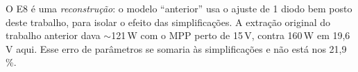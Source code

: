 \begin{atencao}[: ressalva]
O E8 \'e uma \emph{reconstru\c{c}\~ao}: o modelo ``anterior'' usa o ajuste de 1 diodo bem posto deste trabalho, para isolar o efeito das simplifica\c{c}\~oes. A extra\c{c}\~ao original do trabalho anterior dava $\sim$121\,W com o MPP perto de 15\,V, contra 160\,W
em 19,6\,V aqui. Esse erro de par\^ametros se somaria \`as simplifica\c{c}\~oes e n\~ao est\'a nos 21,9\,\%.
\end{atencao}
